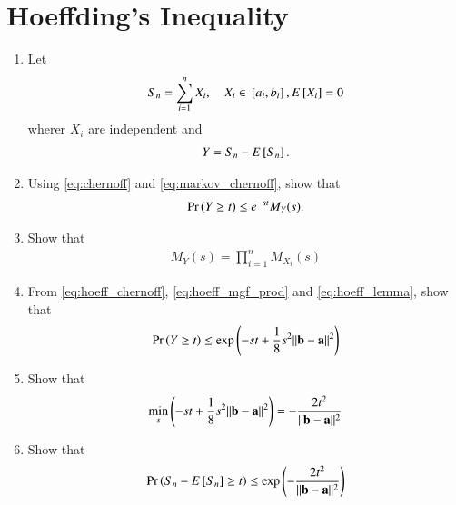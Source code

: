\documentclass[journal,12pt,twocolumn]{IEEEtran}
\renewcommand\thesection{\arabic{section}}
\begin{document}
\section{Hoeffding's Inequality}
\begin{enumerate}[label=\thesection.\arabic*,ref=\thesection.\theenumi]
\item Let 
\begin{align}
S_n=\sum_{i=1}^{n} X_i, \quad X_i \in {}\left[a_i,b_i\right], E{}\left[X_i\right]  = 0
\end{align}
%
wherer $X_i$ are independent and 
\begin{align}
Y = S_n- E{}\left[S_n\right].
\end{align}
%
\item Using \eqref{eq:chernoff} and \eqref{eq:markov_chernoff}, show that 
\begin{align}
\label{eq:hoeff_chernoff}
\Pr\left(Y \ge t\right) \le e^{-st} M_{Y}(s).
\end{align}
\item Show that 
\begin{align}
\label{eq:hoeff_mgf_prod}
M_{Y}(s)= \prod_{i=1}^{n}M_{X_i}(s)
\end{align}
\item From \eqref{eq:hoeff_chernoff}, \eqref{eq:hoeff_mgf_prod} and 
\eqref{eq:hoeff_lemma}, show that 
\begin{align}
\Pr\left(Y \ge t\right) \le \exp\left(-st+\frac{1}{8}s^2\lVert\mathbf{b}-\mathbf{a}\rVert^2\right)
\end{align}
\item Show that 
\begin{align}
\label{eq:hoeff_min_ineq}
\min_{s}\left(-st+\frac{1}{8}s^2\lVert\mathbf{b}-\mathbf{a}\rVert^2\right) = -\frac{2t^2}{\lVert\mathbf{b}-\mathbf{a}\rVert^2}
\end{align}
\item Show that 
\begin{align}
\label{eq:hoeff_ineq}
\Pr\left(S_n- E{}\left[S_n\right] \ge t\right) \le \exp\left(-\frac{2t^2}{\lVert\mathbf{b}-\mathbf{a}\rVert^2}\right)
\end{align}
\end{enumerate}
\end{document}
